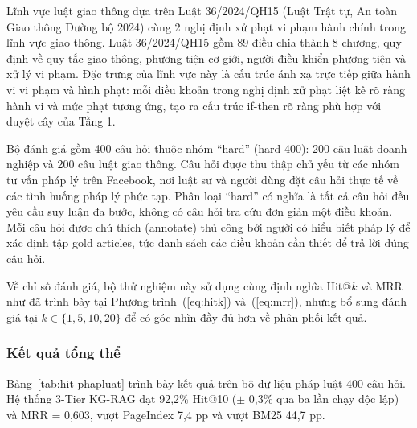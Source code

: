 Lĩnh vực luật giao thông dựa trên Luật 36/2024/QH15 (Luật Trật tự, An toàn Giao
thông Đường bộ 2024) cùng 2 nghị định xử phạt vi phạm hành chính trong lĩnh vực
giao thông. Luật 36/2024/QH15 gồm 89 điều chia thành 8 chương, quy định về quy tắc
giao thông, phương tiện cơ giới, người điều khiển phương tiện và xử lý vi phạm. Đặc
trưng của lĩnh vực này là cấu trúc ánh xạ trực tiếp giữa hành vi vi phạm và hình phạt:
mỗi điều khoản trong nghị định xử phạt liệt kê rõ ràng hành vi và mức phạt tương ứng,
tạo ra cấu trúc if-then rõ ràng phù hợp với duyệt cây của Tầng 1.

Bộ đánh giá gồm 400 câu hỏi thuộc nhóm ``hard'' (hard-400): 200 câu luật doanh
nghiệp và 200 câu luật giao thông. Câu hỏi được thu thập chủ yếu từ các nhóm tư vấn
pháp lý trên Facebook, nơi luật sư và người dùng đặt câu hỏi thực tế về các tình huống
pháp lý phức tạp. Phân loại ``hard'' có nghĩa là tất cả câu hỏi đều yêu cầu suy luận đa
bước, không có câu hỏi tra cứu đơn giản một điều khoản. Mỗi câu hỏi được chú thích
(annotate) thủ công bởi người có hiểu biết pháp lý để xác định tập gold articles, tức danh
sách các điều khoản cần thiết để trả lời đúng câu hỏi.

Về chỉ số đánh giá, bộ thử nghiệm này sử dụng cùng định nghĩa Hit@$k$ và MRR như
đã trình bày tại Phương trình~(\ref{eq:hitk}) và~(\ref{eq:mrr}), nhưng bổ sung đánh giá tại
$k \in \{1, 5, 10, 20\}$ để có góc nhìn đầy đủ hơn về phân phối kết quả.

\subsubsection*{Kết quả tổng thể}

Bảng~\ref{tab:hit-phapluat} trình bày kết quả trên bộ dữ liệu pháp luật 400 câu hỏi. Hệ thống 3-Tier KG-RAG đạt 92,2\% Hit@10 ($\pm$ 0,3\% qua ba lần chạy độc lập) và MRR =
0,603, vượt PageIndex 7,4 pp và vượt BM25 44,7 pp.

